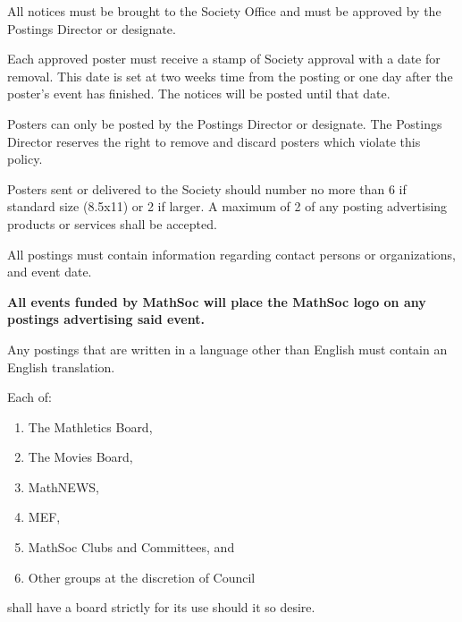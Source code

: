 \documentclass[12pt, letterpaper]{article}
\begin{document}
All notices must be brought to the Society Office and must be approved by the Postings Director or designate.

Each approved poster must receive a stamp of Society approval with a date for removal. This date is set at two weeks time from the posting or one day after the poster's event has finished. The notices will be posted until that date.

Posters can only be posted by the Postings Director or designate. The Postings Director reserves the right to remove and discard posters which violate this policy.

Posters sent or delivered to the Society should number no more than 6 if standard size (8.5x11) or 2 if larger. A maximum of 2 of any posting advertising products or services shall be accepted.

All postings must contain information regarding contact persons or organizations, and event date.

\textbf{All events funded by MathSoc will place the MathSoc logo on any postings advertising said event.}

Any postings that are written in a language other than English must contain an English translation.

Each of:
\begin{enumerate}
	\item The Mathletics Board,
	\item The Movies Board,
	\item MathNEWS,
	\item MEF,
	\item MathSoc Clubs and Committees, and
	\item Other groups at the discretion of Council
\end{enumerate}
shall have a board strictly for its use should it so desire.
\end{document}
